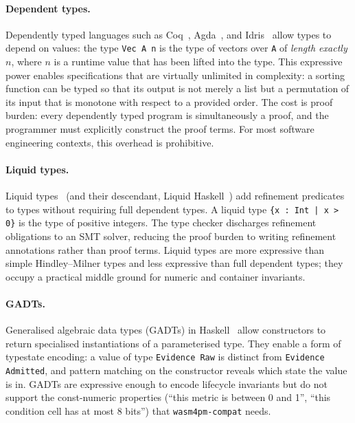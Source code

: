 \paragraph{Dependent types.}
Dependently typed languages such as Coq~\cite{coq2022}, Agda~\cite{norell2009agda},
and Idris~\cite{brady2013idris} allow types to depend on values: the type
\texttt{Vec A n} is the type of vectors over \texttt{A} of \emph{length
exactly} $n$, where $n$ is a runtime value that has been lifted into the type.
This expressive power enables specifications that are virtually unlimited in
complexity: a sorting function can be typed so that its output is not merely a
list but a permutation of its input that is monotone with respect to a provided
order. The cost is proof burden: every dependently typed program is simultaneously
a proof, and the programmer must explicitly construct the proof terms. For most
software engineering contexts, this overhead is prohibitive.

\paragraph{Liquid types.}
Liquid types~\cite{rondon2008liquid} (and their descendant, Liquid
Haskell~\cite{vazou2014liquidhaskell}) add refinement predicates to types
without requiring full dependent types. A liquid type \texttt{\{x : Int |
x > 0\}} is the type of positive integers. The type checker discharges
refinement obligations to an SMT solver, reducing the proof burden to writing
refinement annotations rather than proof terms. Liquid types are more
expressive than simple Hindley--Milner types and less expressive than full
dependent types; they occupy a practical middle ground for numeric and
container invariants.

\paragraph{GADTs.}
Generalised algebraic data types (GADTs) in Haskell~\cite{peytonjones2006gadts}
allow constructors to return specialised instantiations of a parameterised
type. They enable a form of typestate encoding: a value of type
\texttt{Evidence Raw} is distinct from \texttt{Evidence Admitted}, and pattern
matching on the constructor reveals which state the value is in. GADTs are
expressive enough to encode lifecycle invariants but do not support the
const-numeric properties (``this metric is between 0 and 1'',
``this condition cell has at most 8 bits'') that \texttt{wasm4pm-compat} needs.

